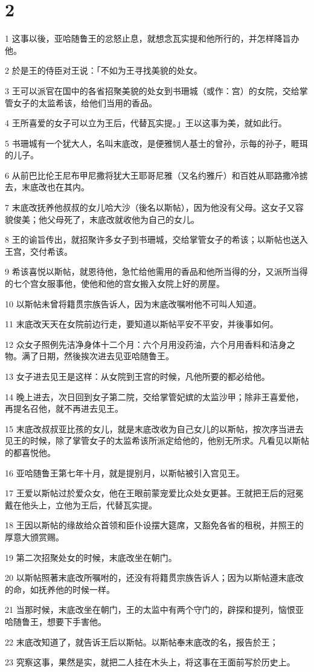 \chapter{2}

\par 1 这事以後，亚哈随鲁王的忿怒止息，就想念瓦实提和他所行的，并怎样降旨办他。
\par 2 於是王的侍臣对王说：「不如为王寻找美貌的处女。
\par 3 王可以派官在国中的各省招聚美貌的处女到书珊城（或作：宫）的女院，交给掌管女子的太监希该，给他们当用的香品。
\par 4 王所喜爱的女子可以立为王后，代替瓦实提。」王以这事为美，就如此行。
\par 5 书珊城有一个犹大人，名叫末底改，是便雅悯人基士的曾孙，示每的孙子，睚珥的儿子。
\par 6 从前巴比伦王尼布甲尼撒将犹大王耶哥尼雅（又名约雅斤）和百姓从耶路撒冷掳去，末底改也在其内。
\par 7 末底改抚养他叔叔的女儿哈大沙（後名以斯帖），因为他没有父母。这女子又容貌俊美；他父母死了，末底改就收他为自己的女儿。
\par 8 王的谕旨传出，就招聚许多女子到书珊城，交给掌管女子的希该；以斯帖也送入王宫，交付希该。
\par 9 希该喜悦以斯帖，就恩待他，急忙给他需用的香品和他所当得的分，又派所当得的七个宫女服事他，使他和他的宫女搬入女院上好的房屋。
\par 10 以斯帖未曾将籍贯宗族告诉人，因为末底改嘱咐他不可叫人知道。
\par 11 末底改天天在女院前边行走，要知道以斯帖平安不平安，并後事如何。
\par 12 众女子照例先洁净身体十二个月：六个月用没药油，六个月用香料和洁身之物。满了日期，然後挨次进去见亚哈随鲁王。
\par 13 女子进去见王是这样：从女院到王宫的时候，凡他所要的都必给他。
\par 14 晚上进去，次日回到女子第二院，交给掌管妃嫔的太监沙甲；除非王喜爱他，再提名召他，就不再进去见王。
\par 15 末底改叔叔亚比孩的女儿，就是末底改收为自己女儿的以斯帖，按次序当进去见王的时候，除了掌管女子的太监希该所派定给他的，他别无所求。凡看见以斯帖的都喜悦他。
\par 16 亚哈随鲁王第七年十月，就是提别月，以斯帖被引入宫见王。
\par 17 王爱以斯帖过於爱众女，他在王眼前蒙宠爱比众处女更甚。王就把王后的冠冕戴在他头上，立他为王后，代替瓦实提。
\par 18 王因以斯帖的缘故给众首领和臣仆设摆大筵席，又豁免各省的租税，并照王的厚意大颁赏赐。
\par 19 第二次招聚处女的时候，末底改坐在朝门。
\par 20 以斯帖照著末底改所嘱咐的，还没有将籍贯宗族告诉人；因为以斯帖遵末底改的命，如抚养他的时候一样。
\par 21 当那时候，末底改坐在朝门，王的太监中有两个守门的，辟探和提列，恼恨亚哈随鲁王，想要下手害他。
\par 22 末底改知道了，就告诉王后以斯帖。以斯帖奉末底改的名，报告於王；
\par 23 究察这事，果然是实，就把二人挂在木头上，将这事在王面前写於历史上。

